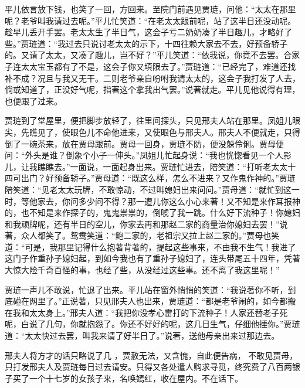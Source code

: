 \begin{parag}
    平儿依言放下钱，也笑了一回，方回来。至院门前遇见贾琏，问他：“太太在那里呢？老爷叫我请过去呢。”平儿忙笑道：“在老太太跟前呢，站了这半日还没动呢。趁早儿丢开手罢。老太太生了半日气，这会子亏二奶奶凑了半日趣儿，才略好了些。”贾琏道：“我过去只说讨老太太的示下，十四往赖大家去不去，好预备轿子的。又请了太太，又凑了趣儿，岂不好？”平儿笑道：“依我说，你竟不去罢。合家子连太太宝玉都有了不是，这会子你又填限去了。”贾琏道：“已经完了，难道还找补不成？况且与我又无干。二则老爷亲自吩咐我请太太的，这会子我打发了人去，倘或知道了，正没好气呢，指著这个拿我出气罢。”说著就走。平儿见他说得有理，也便跟了过来。
\end{parag}


\begin{parag}
    贾琏到了堂屋里，便把脚步放轻了，往里间探头，只见邢夫人站在那里。凤姐儿眼尖，先瞧见了，使眼色儿不命他进来，又使眼色与邢夫人。邢夫人不便就走，只得倒了一碗茶来，放在贾母跟前。贾母一回身，贾琏不防，便没躲伶俐。贾母便问：“外头是谁？倒象个小子一伸头。”凤姐儿忙起身说：“我也恍惚看见一个人影儿，让我瞧瞧去。”一面说，一面起身出来。贾琏忙进去，陪笑道：“打听老太太十四可出门？好预备轿子。”贾母道：“既这么样，怎么不进来？又作鬼作神的。”贾琏陪笑道：“见老太太玩牌，不敢惊动，不过叫媳妇出来问问。”贾母道：“就忙到这一时，等他家去，你问多少问不得？那一遭儿你这么小心来著！又不知是来作耳报神的，也不知是来作探子的，鬼鬼祟祟的，倒唬了我一跳。什么好下流种子！你媳妇和我顽牌呢，还有半日的空儿，你家去再和那赵二家的商量治你媳妇去罢！”说著，众人都笑了。鸳鸯笑道：“鲍二家的，老祖宗又拉上赵二家的。”贾母也笑道：“可是，我那里记得什么抱著背著的，提起这些事来，不由我不生气！我进了这门子作重孙子媳妇起，到如今我也有了重孙子媳妇了，连头带尾五十四年，凭著大惊大险千奇百怪的事，也经了些，从没经过这些事。还不离了我这里呢！”
\end{parag}


\begin{parag}
    贾琏一声儿不敢说，忙退了出来。平儿站在窗外悄悄的笑道：“我说著你不听，到底碰在网里了。”正说著，只见邢夫人也出来，贾琏道：“都是老爷闹的，如今都搬在我和太太身上。”邢夫人道：“我把你没孝心雷打的下流种子！人家还替老子死呢，白说了几句，你就抱怨了。你还不好好的呢，这几日生气，仔细他捶你。”贾琏道：“太太快过去罢，叫我来请了好半日了。”说著，送他母亲出来过那边去。
\end{parag}


\begin{parag}
    邢夫人将方才的话只略说了几 ，贾赦无法，又含愧，自此便告病， 不敢见贾母，只打发邢夫人及贾琏每日过去请安。只得又各处遣人购求寻觅，终究费了八百两银子买了一个十七岁的女孩子来，名唤嫣红，收在屋内。不在话下。
\end{parag}


